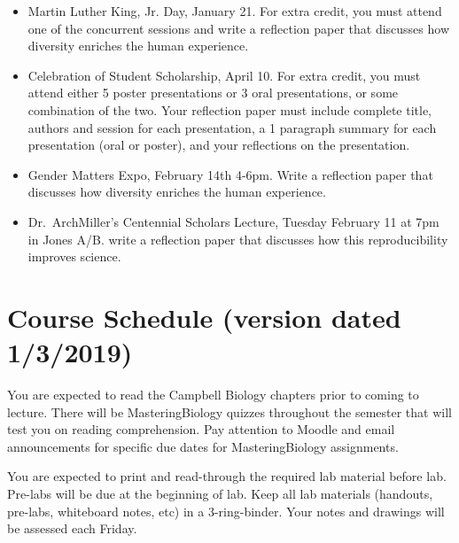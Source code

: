 \documentclass{tufte-handout}
\begin{document}
\begin{fullwidth}
\begin{itemize}
\item Martin Luther King, Jr. Day, January 21. For extra credit, you must attend one of the concurrent sessions and write a reflection paper that discusses how diversity enriches the human experience. 
\item Celebration of Student Scholarship, April 10.  For extra credit, you must attend either 5 poster presentations or 3 oral presentations, or some combination of the two.  Your reflection paper must include complete title, authors and session for each presentation, a 1 paragraph summary for each presentation (oral or poster), and your reflections on the presentation.  	
\item Gender Matters Expo, February 14th 4-6pm. Write a reflection paper that discusses how diversity enriches the human experience.
\item Dr.\ ArchMiller's Centennial Scholars Lecture, Tuesday February 11 at 7pm in Jones A/B. write a reflection paper that discusses how this reproducibility improves science.
\end{itemize}









\newpage
\section{Course Schedule (version dated 1/3/2019)}
%

 You are expected to read the Campbell Biology chapters prior to coming to lecture.  There will be MasteringBiology quizzes throughout the semester that will test you on reading comprehension. Pay attention to Moodle and email announcements for specific due dates for MasteringBiology assignments.

 You are expected to print and read-through the required lab material before lab. Pre-labs will be due at the beginning of lab. Keep all lab materials (handouts, pre-labs, whiteboard notes, etc) in a 3-ring-binder. Your notes and drawings will be assessed each Friday.


\end{fullwidth}
\end{document}
